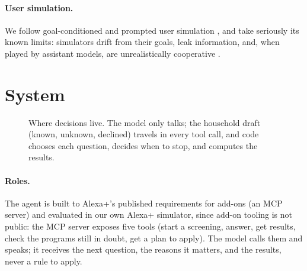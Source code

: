 \documentclass[11pt]{article}
\begin{document}
\paragraph{User simulation.} We follow goal-conditioned and prompted user simulation \citep{schatzmann2006survey,schatzmann2007agenda,terragni2023incontext,balog2025usersim}, and take seriously its known limits: simulators drift from their goals, leak information, and, when played by assistant models, are unrealistically cooperative \citep{sekulic2024daus,zhu2024reliablesimulator,dou2025simulatorarena,naous2025userlm}.

\section{System}
\begin{figure}[t]\centering\small
{}
\caption{Where decisions live. The model only talks; the household draft (known, unknown, declined) travels in every tool call, and code chooses each question, decides when to stop, and computes the results.}
\label{fig:arch}
\end{figure}
\paragraph{Roles.} The agent is built to Alexa+'s published requirements for add-ons (an MCP server) and evaluated in our own Alexa+ simulator, since add-on tooling is not public: the MCP server exposes five tools (start a screening, answer, get results, check the programs still in doubt, get a plan to apply). The model calls them and speaks; it receives the next question, the reasons it matters, and the results, never a rule to apply.
\end{document}
